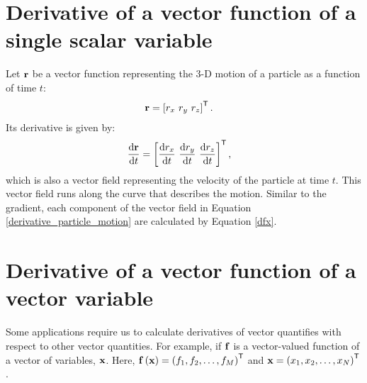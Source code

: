 \documentclass[12pt,letter]{article}
\begin{document}
\newpage


\section{Derivative of a vector function of a single scalar variable}

Let ${\bf r}$ be a vector function representing the 3-D motion of a particle as a function of time $t$: 
\begin{align}
          {\bf r}  &= \left[ r_x\,\,  r_y\,\,  r_z \right]^\mathsf{T}.
	\label{particle_motion}
\end{align}
Its derivative is given by: 
\begin{align}
          \dv{\bf r}{t}  &= \left[ \dv{r_x}{t}\,\,  \dv{r_y}{t}\,\,  \dv{r_z}{t} \right]^\mathsf{T}, 
	\label{derivative_particle_motion}
\end{align}
which is also a vector field representing the velocity of the particle at time $t$. This vector field runs along the curve that describes the motion. Similar to the gradient, each component of the vector field in Equation \ref{derivative_particle_motion} are calculated by Equation \ref{dfx}.

\section{Derivative of a vector function of a vector variable}
\label{sec_jacobian}

Some applications require us to calculate derivatives of vector quantifies with respect to other vector quantities. For example, if ${\bf f}$ is a vector-valued function of a vector of variables, ${\bf x}$. Here, ${\bf f}\left({\bf x}\right) = \left(f_1, f_2, \hdots, f_M\right)^\mathsf{T}$ and ${\bf x} = \left(x_1, x_2, \hdots, x_N\right)^\mathsf{T}$. 
\end{document}
